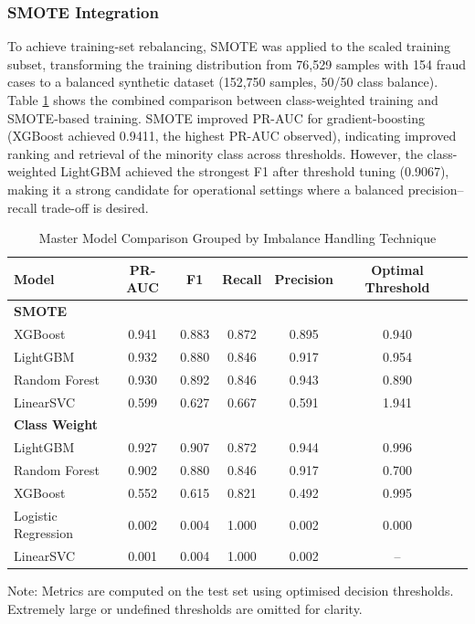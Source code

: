 \documentclass[a4paper,fleqn]{cas-sc}
\begin{document}
\FloatBarrier
\subsubsection{SMOTE Integration}

To achieve training-set rebalancing,  SMOTE was applied to the scaled training subset, transforming the training distribution from 76,529 samples with 154 fraud cases to a balanced synthetic dataset (152,750 samples, 50/50 class balance). Table \ref{tab:model-comparison-grouped} shows the combined comparison between class-weighted training and SMOTE-based training. SMOTE improved PR-AUC for gradient-boosting (XGBoost achieved 0.9411, the highest PR-AUC observed), indicating improved ranking and retrieval of the minority class across thresholds. However, the class-weighted LightGBM achieved the strongest F1 after threshold tuning (0.9067), making it a strong candidate for operational settings where a balanced precision--recall trade-off is desired.

\begin{table}[!htbp]
\centering
\begin{threeparttable}
\caption{Master Model Comparison Grouped by Imbalance Handling Technique}
\label{tab:model-comparison-grouped}
\begin{tabular}{lcccccc}
\toprule
\textbf{Model} & \textbf{PR-AUC} & \textbf{F1} & \textbf{Recall} & \textbf{Precision} & \textbf{Optimal Threshold} \\
\midrule
\multicolumn{6}{l}{\textbf{SMOTE}} \\
\midrule
XGBoost        & 0.941 & 0.883 & 0.872 & 0.895 & 0.940 \\
LightGBM       & 0.932 & 0.880 & 0.846 & 0.917 & 0.954 \\
Random Forest  & 0.930 & 0.892 & 0.846 & 0.943 & 0.890 \\
LinearSVC      & 0.599 & 0.627 & 0.667 & 0.591 & 1.941 \\
\midrule
\multicolumn{6}{l}{\textbf{Class Weight}} \\
\midrule
LightGBM             & 0.927 & 0.907 & 0.872 & 0.944 & 0.996 \\
Random Forest        & 0.902 & 0.880 & 0.846 & 0.917 & 0.700 \\
XGBoost              & 0.552 & 0.615 & 0.821 & 0.492 & 0.995 \\
Logistic Regression  & 0.002 & 0.004 & 1.000 & 0.002 & 0.000 \\
LinearSVC            & 0.001 & 0.004 & 1.000 & 0.002 & -- \\
\bottomrule
\end{tabular}

\begin{tablenotes}
\footnotesize
\item Note: Metrics are computed on the test set using optimised decision thresholds. 
Extremely large or undefined thresholds are omitted for clarity.
\end{tablenotes}
\end{threeparttable}
\end{table}
\FloatBarrier
\end{document}
